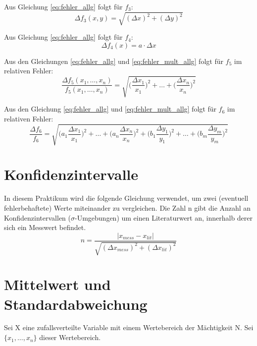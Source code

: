 Aus Gleichung \eqref{eq:fehler_allg} folgt für $f_3$:
\begin{equation}
    \Delta f_3(x,y) = \sqrt{(\Delta x)^2 + (\Delta y)^2} \label{eq:fehler_add_einfach}
\end{equation}

Aus Gleichung \eqref{eq:fehler_allg} folgt für $f_4$:
\begin{equation}
    \Delta f_4(x) = a \cdot \Delta x \label{eq:fehler_const_einfach}
\end{equation}

Aus den Gleichungen \eqref{eq:fehler_allg} und \eqref{eq:fehler_mult_allg} folgt für $f_5$ im relativen Fehler:
\begin{equation}
    \frac{\Delta f_5(x_1, \dots, x_n)}{f_5(x_1, \dots, x_n)} = \sqrt{\bigg(\frac{\Delta x_1}{x_1}\bigg)^2 + \dots + \bigg(\frac{\Delta x_n}{x_n}\bigg)^2} \label{eq:fehler_const_mult}
\end{equation}

Aus den Gleichung \eqref{eq:fehler_allg} und \eqref{eq:fehler_mult_allg} folgt für $f_6$ im relativen Fehler:
\begin{equation}
    \frac{\Delta f_6}{f_6}  = \sqrt{\bigg(a_1\frac{\Delta x_1}{x_1}\bigg)^2 + \dots + \bigg(a_n\frac{\Delta x_n}{x_n}\bigg)^2 + \bigg(b_1\frac{\Delta y_1}{y_1}\bigg)^2 + \dots + \bigg(b_m\frac{\Delta y_m}{y_m}\bigg)^2} \label{eq:fehler_div}
\end{equation}

\section{Konfidenzintervalle}

In diesem Praktikum wird die folgende Gleichung verwendet, um zwei (eventuell fehlerbehaftete) Werte miteinander zu vergleichen. Die Zahl n gibt die Anzahl an Konfidenzintervallen ($\sigma$-Umgebungen) um einen Literaturwert an, innerhalb derer sich ein Messwert befindet.
\begin{equation}
    n = \frac{|x_{mess} - x_{lit}|}{\sqrt{(\Delta x_{mess})^2 + (\Delta x_{lit})^2}} \label{eq:fehler_konf}
\end{equation}

\section{Mittelwert und Standardabweichung}

Sei X eine zufallsverteilte Variable mit einem Wertebereich der Mächtigkeit N. Sei $\{x_1, \dots, x_n\}$ dieser Wertebereich.

